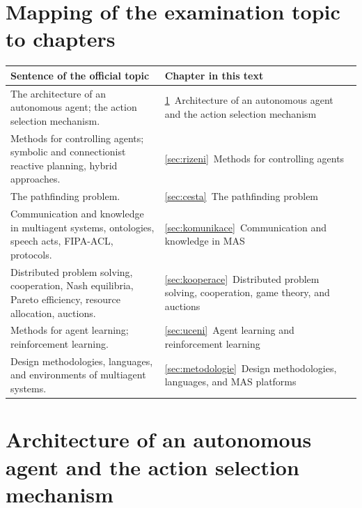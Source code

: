 \documentclass[11pt,a4paper]{article}
\theoremstyle{definition}
\begin{document}
\section*{Mapping of the examination topic to chapters}

\begin{center}
\small
\begin{tabular}{p{} p{}}
\toprule
\textbf{Sentence of the official topic} & \textbf{Chapter in this text} \\
\midrule
The architecture of an autonomous agent; the action selection mechanism.
  & \ref{sec:architektura}~Architecture of an autonomous agent and the action selection
    mechanism \\
Methods for controlling agents; symbolic and connectionist reactive planning, hybrid approaches.
  & \ref{sec:rizeni}~Methods for controlling agents \\
The pathfinding problem.
  & \ref{sec:cesta}~The pathfinding problem \\
Communication and knowledge in multiagent systems, ontologies, speech acts, FIPA-ACL, protocols.
  & \ref{sec:komunikace}~Communication and knowledge in MAS \\
Distributed problem solving, cooperation, Nash equilibria, Pareto efficiency, resource
allocation, auctions.
  & \ref{sec:kooperace}~Distributed problem solving, cooperation, game theory, and auctions \\
Methods for agent learning; reinforcement learning.
  & \ref{sec:uceni}~Agent learning and reinforcement learning \\
Design methodologies, languages, and environments of multiagent systems.
  & \ref{sec:metodologie}~Design methodologies, languages, and MAS platforms \\
\bottomrule
\end{tabular}
\end{center}

\tableofcontents
\newpage

\section{Architecture of an autonomous agent and the action selection mechanism}
\label{sec:architektura}
\end{document}

